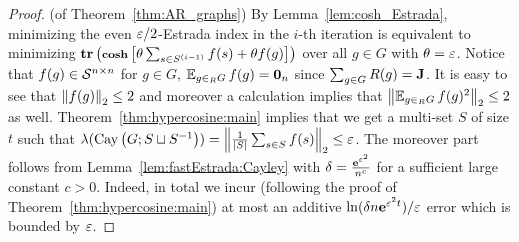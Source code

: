 %
%
%
\begin{proof}(of Theorem~\ref{thm:AR_graphs})
By Lemma~\ref{lem:cosh_Estrada}, minimizing the even $\varepsilon/2$-Estrada index in the $i$-th iteration is equivalent to minimizing $\operatorname{\textbf{tr}}\left( \operatorname{\textbf{\footnotesize cosh}}\left[ \theta \sum_{s\in S^{(i-1)}} f(s) +\theta f(g) \right] \right)$ over all $g\in G$ with $\theta = \varepsilon$. Notice that $f(g)\in \mathcal{S}^{n\times n}$ for $g\in G$, $\operatorname{\mathbb{E}}_{g\in_R{G}}{f(g)} = \mathbf{0}_n$ since $\sum_{g\in G}R(g) = \mathbf{J}$. It is easy to see that $\left\|f(g)\right\|_2 \leq 2$ and moreover a calculation implies that $\left\|\operatorname{\mathbb{E}}_{g\in_R{G}}{f(g)^2}\right\|_2 \leq 2$ as well. Theorem~\ref{thm:hypercosine:main} implies that we get a multi-set $S$ of size $t$ such that $\lambda (\operatorname{Cay}\left(G;  S\sqcup S^{-1}\right))=\left\|\frac1{|S|} \sum_{s\in S} f(s) \right\|_2  \leq \varepsilon$. The moreover part follows from Lemma~\ref{lem:fastEstrada:Cayley} with $\delta = \frac{{\mathbf e}^{\varepsilon^2}}{n^c}$ for a sufficient large constant $c>0$. Indeed, in total we incur (following the proof of Theorem~\ref{thm:hypercosine:main}) at most an additive $\ln( \delta n {\mathbf e}^{\varepsilon^2 t}) / \varepsilon$ error which is bounded by $\varepsilon$.
\end{proof}
%
%
%
